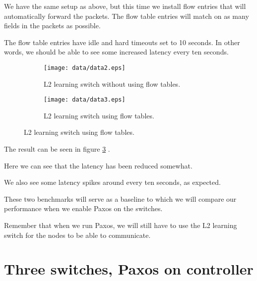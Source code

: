 We have the same setup as above, but this time we install flow entries that
will automatically forward the packets.  The flow table entries will match
on as many fields in the packets as possible.

The flow table entries have idle and hard timeouts set to 10 seconds.
In other words, we should be able to see some increased latency every ten
seconds.

\begin{figure}
  \centering
  \begin{subfigure}{\textwidth}
    \centering
    \texttt{[image: data/data2.eps]}
    \caption{L2 learning switch without using flow tables.}
    \label{benchmark:l2.learning.switch.no.flows}
  \end{subfigure}

  \centering
  \begin{subfigure}{\textwidth}
    \centering
    \texttt{[image: data/data3.eps]}
    \caption{L2 learning switch using flow tables.}
    \label{benchmark:l2.learning.switch.with.flows}
  \end{subfigure}
\end{figure}

The result can be seen in figure \ref{benchmark:l2.learning.switch.with.flows}
.

Here we can see that the latency has been reduced somewhat.

We also see some latency spikes around every ten seconds, as expected.


These two benchmarks will serve as a baseline to which we will compare our
performance when we enable Paxos on the switches.

Remember that when we run Paxos, we will still have to use the L2 learning
switch for the nodes to be able to communicate.


\section{Three switches, Paxos on controller}

